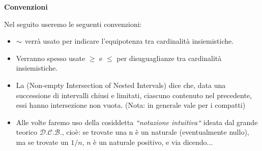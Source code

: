 \textbf{\Large Convenzioni}
\vspace{1em}

Nel seguito useremo le seguenti convenzioni:

\begin{itemize}
\item $\sim$ verrà usato per indicare l’equipotenza tra cardinalità insiemistiche.
\item Verranno spesso usate $\ge$ e $\le$ per disuguaglianze tra cardinalità insiemistiche.
\item La \NINI (Non-empty Intersection of Nested Intervals) dice che, data
una successione di intervalli chiusi e limitati, ciascuno contenuto nel
precedente, essi hanno intersezione non vuota. (Nota: in generale vale per i
compatti)
\item Alle volte faremo uso della cosiddetta \emph{“notazione intuitiva“} ideata dal
grande teorico $\mathcal{D.C.B.}$, cioè: se trovate una n è un naturale (eventualmente
nullo), ma se trovate un $1/n$, $n$ è un naturale positivo, e via dicendo...
\end{itemize}
